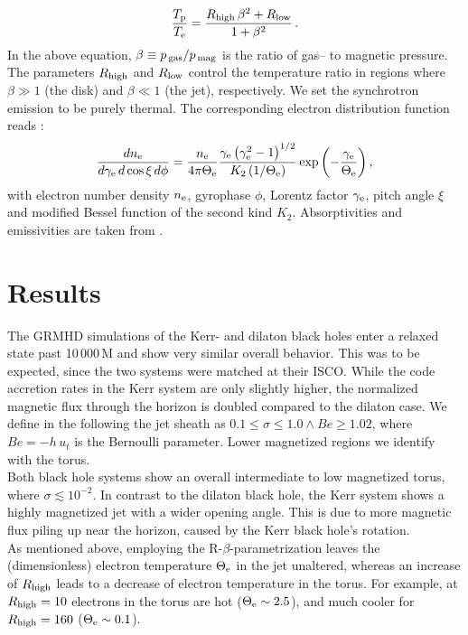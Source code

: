 \documentclass[a4paper,11pt]{article}
\begin{document}
\begin{equation} \label{eq:tratio_beta}
\frac{T_{\rm p}}{T_{\rm e}}=\frac{R_{\rm high}\,\beta^2+R_{\rm low}}{1+\beta^2}\,.
\end{equation}
In the above equation, $\beta\equiv p_{\rm\,gas}/p_{\rm\,mag}$ is the ratio of gas-- to magnetic pressure. The parameters $R_{\rm high}$ and $R_{\rm low}$ control the temperature ratio in regions where $\beta\gg1$ (the disk) and $\beta\ll1$ (the jet), respectively. We set the synchrotron emission to be purely thermal. The corresponding electron distribution function reads \cite{Leung2011}:
\begin{equation}\label{eq:rel_thermal}
\frac{dn_{\rm e}}{d\gamma_{\rm e}\,d\cos\xi\,d\phi} = \frac{n_{\rm e}}{4 \pi \Theta_{\rm e}} \frac{\gamma_{\rm e} \left(\gamma_{\rm e}^2 - 1\right)^{1/2}}{K_2\left(1/\Theta_{\rm e}\right)} \exp \left(- \frac{\gamma_{\rm e}}{\Theta_{\rm e}}\right),
\end{equation}
with electron number density $n_{\rm e}$, gyrophase $\phi$, Lorentz factor $\gamma_{\rm e}$, pitch angle $\xi$ and modified Bessel function of the second kind $K_2$. Absorptivities and emissivities are taken from \cite{Pandya2016}. 


\section{Results}

The GRMHD simulations of the Kerr- and dilaton black holes enter a relaxed state past 10\,000\,M and show very similar overall behavior. This was to be expected, since the two systems were matched at their ISCO. While the code accretion rates in the Kerr system are only slightly higher, the normalized magnetic flux through the horizon is doubled compared to the dilaton case. We define in the following the jet sheath as $0.1\leq\sigma\leq1.0 \wedge Be\geq1.02$, where $Be=-h\,u_t$ is the Bernoulli parameter. Lower magnetized regions we identify with the torus.\\
Both black hole systems show an overall intermediate to low magnetized torus, where $\sigma \lesssim 10^{-2}$. In contrast to the dilaton black hole, the Kerr system shows a highly magnetized jet with a wider opening angle. This is due to more magnetic flux piling up near the horizon, caused by the Kerr black hole's rotation.\\
As mentioned above, employing the R-$\beta$-parametrization leaves the (dimensionless) electron temperature $\Theta_{\rm e}$ in the jet unaltered, whereas an increase of $R_{\rm high}$ leads to a decrease of electron temperature in the torus. For example, at $R_{\rm high}=10$ electrons in the torus are hot ($\Theta_{\rm e}\sim 2.5$), and much cooler for $R_{\rm high}=160$ ($\Theta_{\rm e}\sim0.1$).\\
\end{document}
